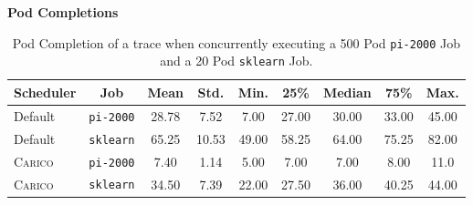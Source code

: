 
\textbf{Pod Completions}\\
\begin{table}[ht!]
\centering
    \begin{tabular}{|l|c|c|c|c|c|c|c|c|}
    \hline
        \bfseries Scheduler & \bfseries Job & \bfseries Mean & \bfseries Std. &
        \bfseries Min. & \bfseries 25\% & \bfseries Median & \bfseries 75\% & \bfseries Max. \\
    \hline
        Default & \texttt{pi-2000} & 28.78 & 7.52 & 7.00 & 27.00 & 30.00 & 33.00 & 45.00 \\
        Default & \texttt{sklearn} & 65.25 & 10.53 & 49.00 & 58.25 & 64.00 & 75.25 & 82.00 \\
        \textsc{Carico} & \texttt{pi-2000} & 7.40 & 1.14 & 5.00 & 7.00 & 7.00 & 8.00 & 11.0 \\
        \textsc{Carico} & \texttt{sklearn} & 34.50 & 7.39 & 22.00 & 27.50 & 36.00 & 40.25 & 44.00 \\
    \hline
    \end{tabular}
    \caption{Pod Completion of a trace when concurrently executing a 500 Pod \texttt{pi-2000}
    Job and a 20 Pod \texttt{sklearn} Job.}
    \label{tab:mixed-pod-completions}
\end{table}

